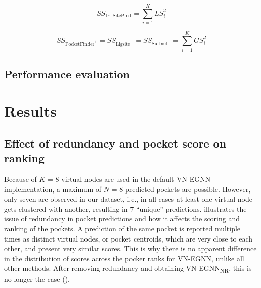 \begin{equation}
SS_{\text{IF--SitePred}} = \sum_{i=1}^{K} LS_i^2
\label{eq:IFSP_pocket_score}
\end{equation}

\begin{equation}
SS_{\text{PocketFinder}^+} = SS_{\text{Ligsite}^+} = SS_{\text{Surfnet}^+} = \sum_{i=1}^{K} GS_i^2
\label{eq:leagcy_methos_pocket_score}
\end{equation}

\subsection{Performance evaluation}

\FloatBarrier

\section{Results}

\subsection{Effect of redundancy and pocket score on ranking}

Because of $K$ = 8 virtual nodes are used in the default VN-EGNN implementation, a maximum of $N$ = 8 predicted pockets are possible. However, only seven are observed in our dataset, i.e., in all cases at least one virtual node gets clustered with another, resulting in 7 ``unique'' predictions.  illustrates the issue of redundancy in pocket predictions and how it affects the scoring and ranking of the pockets. A prediction of the same pocket is reported multiple times as distinct virtual nodes, or pocket centroids, which are very close to each other, and present very similar scores. This is why there is no apparent difference in the distribution of scores across the pocker ranks for VN-EGNN, unlike all other methods. After removing redundancy and obtaining VN-EGNN\textsubscript{NR}, this is no longer the case ().

